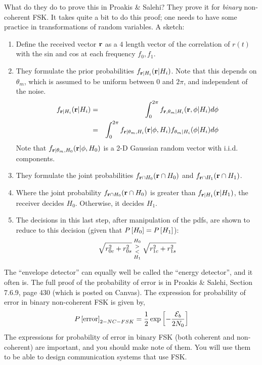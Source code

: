 What do they do to prove this in Proakis \& Salehi?  They prove it for
\emph{binary} non-coherent FSK.  It takes quite a bit to do
this proof; one needs to have some practice in transformations of random variables.  A sketch:
\begin{enumerate}
 \item Define the received vector $\mathbf{r}$ as a $4$ length vector of
   the correlation of $r(t)$ with the sin and cos at each frequency $f_0, f_1$.
 \item They formulate the prior probabilities $f_{\mathbf{r} | H_i}(\mathbf{r} | H_i)$.  Note that
   this depends on $\theta_m$, which is assumed to be uniform between
   $0$ and $2\pi$, and independent of the noise.
   \begin{eqnarray}
     f_{\mathbf{r} | H_i}(\mathbf{r} | H_i) &=& \int_0^{2\pi} f_{\mathbf{r},\theta_m | H_i}(\mathbf{r},\phi |
     H_i) d\phi \nonumber \\
         &=& \int_0^{2\pi} f_{\mathbf{r} | \theta_m, H_i}(\mathbf{r} | \phi, H_i) f_{\theta_m|H_i}(\phi | H_i) d\phi \nonumber \\
   \end{eqnarray}
   Note that $f_{\mathbf{r} |  \theta_m, H_0}(\mathbf{r} | \phi, H_0)$ is a 2-D Gaussian random vector with i.i.d. components.
 \item They formulate the joint probabilities $f_{\mathbf{r} \cap H_0}(\mathbf{r} \cap H_0)$
   and $f_{\mathbf{r} \cap H_1}(\mathbf{r} \cap H_1)$.
 \item Where the joint probability $f_{\mathbf{r} \cap H_0}(\mathbf{r} \cap H_0)$ is
   greater than $f_{\mathbf{r}| H_1}(\mathbf{r} | H_1)$, the receiver decides
   $H_0$.  Otherwise, it decides $H_1$.
 \item The decisions in this last step, after manipulation of the
   pdfs, are shown to reduce to this decision (given that $P\left[{H_0}\right] =
   P\left[{H_1}\right]$):
   \[
     \sqrt{r_{0c}^2 + r_{0s}^2} {{H_0 \atop >} \atop {< \atop H_1}} \sqrt{r_{1c}^2 + r_{1s}^2}
   \]
\end{enumerate}
The ``envelope detector'' can equally well be called the ``energy
detector'', and it often is.  The full proof of the probability of error is in Proakis \& Salehi, Section 7.6.9, page 430 (which is posted on Canvas).  The expression for probability of error in binary non-coherent FSK is given by,
\begin{equation} \label{E:2-nc-fsk}
 P\left[{\mbox{error}}\right]_{2-NC-FSK} = \frac{1}{2} \exp \left[- \frac{\mathcal{E}_b}{2N_0} \right]
\end{equation}
The expressions for probability of error in binary FSK (both coherent and non-coherent) are important, and you should make note of them.  You will use them to be able to design communication systems that use FSK.





















